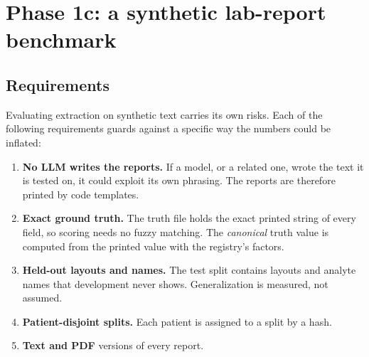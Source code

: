 \documentclass[11pt,a4paper]{article}
\begin{document}
\section{Phase 1c: a synthetic lab-report benchmark}

\subsection{Requirements}
Evaluating extraction on synthetic text carries its own risks. Each of the following requirements guards against a specific way the numbers could be inflated:
\begin{enumerate}
  \item \textbf{No LLM writes the reports.} If a model, or a related one, wrote the text it is tested on, it could exploit its own phrasing. The reports are therefore printed by code templates.
  \item \textbf{Exact ground truth.} The truth file holds the exact printed string of every field, so scoring needs no fuzzy matching. The \emph{canonical} truth value is computed from the printed value with the registry's factors.
  \item \textbf{Held-out layouts and names.} The test split contains layouts and analyte names that development never shows. Generalization is measured, not assumed.
  \item \textbf{Patient-disjoint splits.} Each patient is assigned to a split by a hash.
  \item \textbf{Text and PDF} versions of every report.
\end{enumerate}
\end{document}
